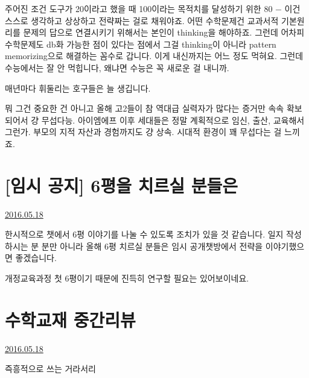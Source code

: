 주어진 조건 도구가 20이라고 했을 때 100이라는 목적치를 달성하기 위한 80 $-$ 이건 스스로 생각하고 상상하고 전략짜는 걸로 채워야죠.
어떤 수학문제건 교과서적 기본원리를 문제의 답으로 연결시키기 위해서는 본인이 thinking을 해야하죠.
그런데 어차피 수학문제도 db화 가능한 점이 있다는 점에서 그걸 thinking이 아니라 pattern memorizing으로 해결하는 꼼수로 갑니다.
이게 내신까지는 어느 정도 먹혀요. 그런데 수능에서는 잘 안 먹힙니다, 왜냐면 수능은 꼭 새로운 걸 내니까.
\vspace{5mm}

매년마다 휘둘리는 호구들은 늘 생깁니다.
\vspace{5mm}

뭐 그건 중요한 건 아니고 올해 고2들이 참 역대급 실력자가 많다는 증거만 속속 확보되어서 걍 무섭다능.
아이엠에프 이후 세대들은 정말 계획적으로 임신, 출산, 교육해서 그런가. 부모의 지적 자산과 경험까지도 걍 상속.
시대적 환경이 꽤 무섭다는 걸 느끼죠.
\vspace{5mm}









\section{[임시 공지] 6평을 치르실 분들은}
\href{https://www.kockoc.com/Apoc/779984}{2016.05.18}

\vspace{5mm}

한시적으로 챗에서 6평 이야기를 나눌 수 있도록 조치가 있을 것 같습니다.
일지 작성하시는 분 분만 아니라 올해 6평 치르실 분들은 임시 공개챗방에서 전략을 이야기했으면 좋겠습니다.
\vspace{5mm}

개정교육과정 첫 6평이기 때문에 진득히 연구할 필요는 있어보이네요.





\section{수학교재 중간리뷰}
\href{https://www.kockoc.com/Apoc/780165}{2016.05.18}

\vspace{5mm}

즉흥적으로 쓰는 거라서리
\vspace{5mm}

